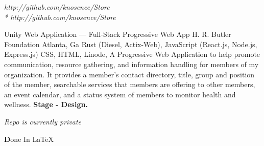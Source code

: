 \documentclass{resume-class/nadario_resume}
\begin{document}
          {}{\textit{http://github.com/knosence/Store \\* http://github.com/knosence/Store}}
        \vspace{.25cm}

        {Unity Web Application --- Full-Stack Progressive Web App}
        {H. R. Butler Foundation}
        {Atlanta, Ga}
        {}{Rust (Diesel, Actix-Web), JavaScript (React.js, Node.js, Express.js) CSS, HTML, Linode, }
          \indent A Progressive Web Application to help promote communication, resource gathering, and information handling for members of my organization. It provides a member's contact directory, title, group and position of the member, searchable services that members are offering to other members, an event calendar, and a status system of members to monitor health and wellness.
          \textbf{Stage - Design.}

        {}{\textit{Repo is currently private}}
        \vspace{.25cm}


        \begin{center} \textbf Done In \LaTeX \end{center}
\end{document}
